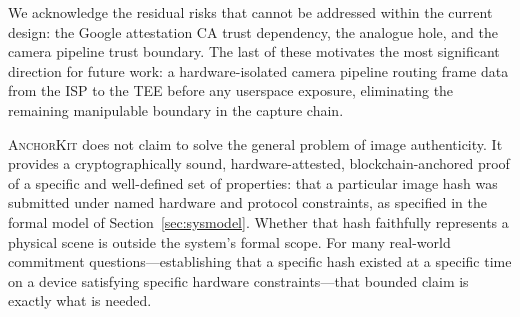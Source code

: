 \documentclass[11pt,a4paper]{article}
\newcommand{\AK}{\textsc{AnchorKit}\xspace}
\begin{document}
We acknowledge the residual risks that cannot be addressed within the current
design: the Google attestation CA trust dependency, the analogue hole, and the
camera pipeline trust boundary.  The last of these motivates the most
significant direction for future work: a hardware-isolated camera pipeline
routing frame data from the ISP to the TEE before any userspace exposure,
eliminating the remaining manipulable boundary in the capture chain.

\AK does not claim to solve the general problem of image authenticity.  It
provides a cryptographically sound, hardware-attested, blockchain-anchored proof
of a specific and well-defined set of properties: that a particular image hash
was submitted under named hardware and protocol constraints, as specified in the
formal model of Section~\ref{sec:sysmodel}.  Whether that hash faithfully
represents a physical scene is outside the system's formal scope.  For many
real-world commitment questions---establishing that a specific hash existed at a
specific time on a device satisfying specific hardware constraints---that bounded
claim is exactly what is needed.
\end{document}
